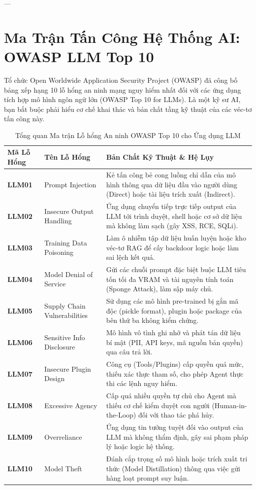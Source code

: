---

\section{Ma Trận Tấn Công Hệ Thống AI: OWASP LLM Top 10}
\label{sec:ch12-owasp-top10}

Tổ chức Open Worldwide Application Security Project (OWASP) đã công bố bảng xếp hạng 10 lỗ hổng an ninh mạng nguy hiểm nhất đối với các ứng dụng tích hợp mô hình ngôn ngữ lớn (OWASP Top 10 for LLMs). Là một kỹ sư AI, bạn bắt buộc phải hiểu cơ chế khai thác và bản chất tầng kỹ thuật của các véc-tơ tấn công này.

\begin{table}[htbp]
\centering
\small
\caption{Tổng quan Ma trận Lỗ hổng An ninh OWASP Top 10 cho Ứng dụng LLM}
\label{tab:owasp-llm-top10}
\begin{tabular}{p{2.2cm}p{3.8cm}p{6.8cm}}
\toprule
\textbf{Mã Lỗ Hổng} & \textbf{Tên Lỗ Hổng} & \textbf{Bản Chất Kỹ Thuật \& Hệ Lụy} \\
\midrule
\textbf{LLM01} & Prompt Injection & Kẻ tấn công bẻ cong luồng chỉ dẫn của mô hình thông qua dữ liệu đầu vào người dùng (Direct) hoặc tài liệu trích xuất (Indirect). \\
\textbf{LLM02} & Insecure Output Handling & Ứng dụng chuyển tiếp trực tiếp output của LLM tới trình duyệt, shell hoặc cơ sở dữ liệu mà không làm sạch (gây XSS, RCE, SQLi). \\
\textbf{LLM03} & Training Data Poisoning & Làm ô nhiễm tập dữ liệu huấn luyện hoặc kho véc-tơ RAG để cấy backdoor logic hoặc làm sai lệch kết quả. \\
\textbf{LLM04} & Model Denial of Service & Gửi các chuỗi prompt đặc biệt buộc LLM tiêu tốn tối đa VRAM và tài nguyên tính toán (Sponge Attack), làm sập máy chủ. \\
\textbf{LLM05} & Supply Chain Vulnerabilities & Sử dụng các mô hình pre-trained bị gắn mã độc (pickle format), plugin hoặc package của bên thứ ba không kiểm chứng. \\
\textbf{LLM06} & Sensitive Info Disclosure & Mô hình vô tình ghi nhớ và phát tán dữ liệu bí mật (PII, API keys, mã nguồn bản quyền) qua câu trả lời. \\
\textbf{LLM07} & Insecure Plugin Design & Công cụ (Tools/Plugins) cấp quyền quá mức, thiếu xác thực tham số, cho phép Agent thực thi các lệnh nguy hiểm. \\
\textbf{LLM08} & Excessive Agency & Cấp quá nhiều quyền tự chủ cho Agent mà thiếu cơ chế kiểm duyệt con người (Human-in-the-Loop) đối với thao tác phá hủy. \\
\textbf{LLM09} & Overreliance & Ứng dụng tin tưởng tuyệt đối vào output của LLM mà không thẩm định, gây sai phạm pháp lý hoặc logic hệ thống. \\
\textbf{LLM10} & Model Theft & Đánh cắp trọng số mô hình hoặc trích xuất tri thức (Model Distillation) thông qua việc gửi hàng loạt prompt suy luận. \\
\bottomrule
\end{tabular}
\end{table}

